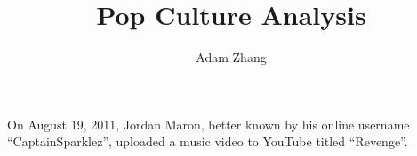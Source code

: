 \documentclass[mla8]{mla}
\title{Pop Culture Analysis}
\author{Adam Zhang}
\date{\mladate}
\newcommand{\song}{``Revenge''}
\begin{document}
\begin{paper}
  On August 19, 2011, Jordan Maron, better known by his online username
  ``CaptainSparklez'', uploaded a music video to YouTube titled \song.
\end{paper}

\begin{workscited}
  \printbibliography[heading=none]
\end{workscited}
\end{document}
